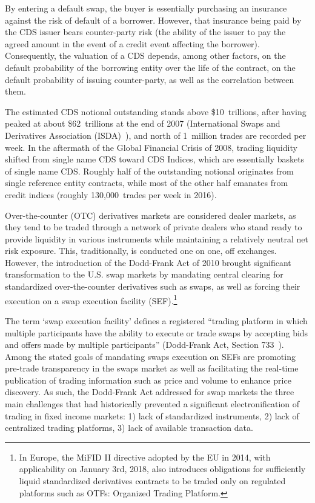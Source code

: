 \begin{enumerate}
By entering a default swap, the buyer is essentially purchasing an insurance against the risk of default of a borrower. However, that insurance being paid by the CDS issuer bears counter-party risk (the ability of the issuer to pay the agreed amount in the event of a credit event affecting the borrower). Consequently, the valuation of a CDS depends, among other factors, on the default probability of the borrowing entity over the life of the contract, on the default probability of issuing counter-party, as well as the correlation between them.


The estimated CDS notional outstanding stands above \$10~trillions, after having peaked at about \$62~trillions at the end of 2007 (International Swaps and Derivatives Association (ISDA)~\cite{ISDA}), and north of 1~million trades are recorded per week. In the aftermath of the Global Financial Crisis of 2008, trading liquidity shifted from single name CDS toward CDS Indices, which are essentially baskets of single name CDS. Roughly half of the outstanding notional originates from single reference entity contracts, while most of the other half emanates from credit indices (roughly 130,000~trades per week in 2016).


Over-the-counter (OTC) derivatives markets are considered dealer markets, as they tend to be traded through a network of private dealers who stand ready to provide liquidity in various instruments while maintaining a relatively neutral net risk exposure. This, traditionally, is conducted one on one, off exchanges. However, the introduction of the Dodd-Frank Act of 2010 brought significant transformation to the U.S. swap markets by mandating central clearing for standardized over-the-counter derivatives such as swaps, as well as forcing their execution on a swap execution facility (SEF).\footnote{In Europe, the MiFID II directive adopted by the EU in 2014, with applicability on January 3rd, 2018, also introduces obligations for sufficiently liquid standardized derivatives contracts to be traded only on regulated platforms such as OTFs: Organized Trading Platform.}


The term `swap execution facility' defines a registered ``trading platform in which multiple participants have the ability to execute or trade swaps by accepting bids and offers made by multiple participants'' (Dodd-Frank Act, Section 733~\cite{DoddFrank}). Among the stated goals of mandating swaps execution on SEFs are promoting pre-trade transparency in the swaps market as well as facilitating the real-time publication of trading information such as price and volume to enhance price discovery. As such, the Dodd-Frank Act addressed for swap markets the three main challenges that had historically prevented a significant electronification of trading in fixed income markets: 1) lack of standardized instruments, 2) lack of centralized trading platforms, 3) lack of available transaction data.



\end{enumerate}
